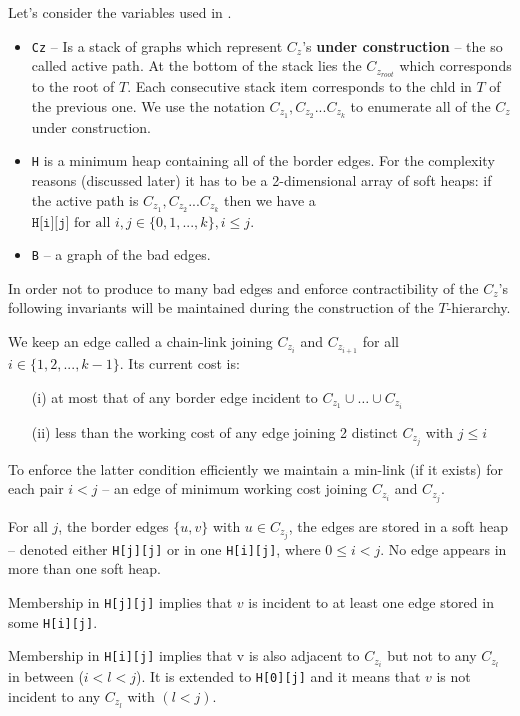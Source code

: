 Let's consider the variables used in .
\begin{itemize}
    \item \texttt{Cz} -- Is a stack of graphs which represent $C_z$'s \textbf{under construction} -- the so called active path. At the bottom of the stack lies the $C_{z_{root}}$ which corresponds to the root of $T$. Each consecutive stack item corresponds to the chld in $T$ of the previous one.   
    We use the notation $C_{z_1}, C_{z_2} ...C_{z_k}$ to enumerate all of the $C_z$ under construction.
    \item \texttt{H} is a minimum heap containing all of the border edges. For the complexity reasons (discussed later) it has to be a 2-dimensional array of soft heaps: if the active path is $C_{z_1}, C_{z_2} ...C_{z_k}$ then we have a $\texttt{H[i][j]} \text{ for all } i,j \in \{0, 1,..., k\}, i \leq j$.
    \item \texttt{B} -- a graph of the bad edges.
\end{itemize}

In order not to produce to many bad edges and enforce contractibility of the $C_z$'s following invariants will be maintained during the construction of the $T$-hierarchy.

\begin{invariant}[\cite{C2000}]
We keep an edge called a chain-link joining $C_{z_i}$ and $C_{z_{i+1}}$ for all $i \in \{1, 2, ..., k - 1\}$. Its current cost is:
\begin{enumerate}
    \item[(i)] at most that of any border edge incident to $C_{z_1} \cup \dots \cup C_{z_i}$
    \item[(ii)] less than the working cost of any edge joining 2 distinct $C_{z_j}$ with $j \leq i$
\end{enumerate}
\label{i1}
\end{invariant} 
To enforce the latter condition efficiently we maintain a min-link (if it exists) for each pair $i < j$ -- an edge of minimum working cost joining $C_{z_i}$ and $C_{z_j}$.

\begin{invariant}[\cite{C2000}]
For all $j$, the border edges $\{u, v\}$ with $u \in C_{z_j}$, the edges are stored in a soft heap -- denoted either \texttt{H[j][j]} or in one \texttt{H[i][j]}, where $0 \leq i < j$. No edge appears in more than one soft heap.

Membership in \texttt{H[j][j]} implies that $v$ is incident to at least one edge stored in some \texttt{H[i][j]}.

Membership in \texttt{H[i][j]} implies that v is also adjacent to $C_{z_i}$ but not to any $C_{z_l}$ in between ($i < l < j$). It is extended to \texttt{H[0][j]} and it means that $v$ is not incident to any $C_{z_l}$ with $(l < j)$.
\label{i2}
\end{invariant}

